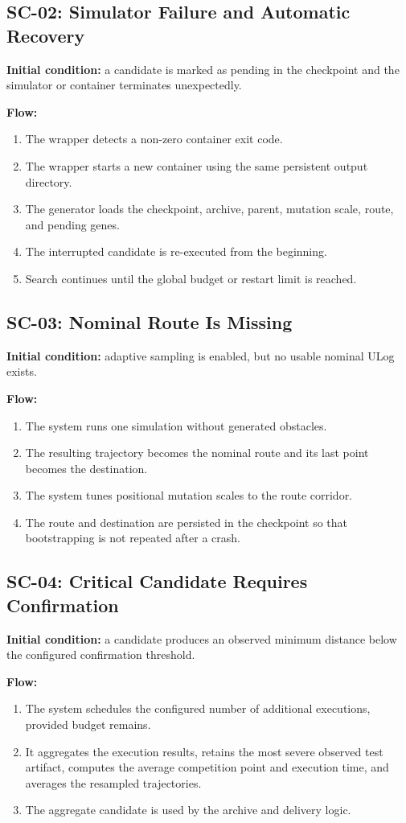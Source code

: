 \documentclass[11pt,a4paper]{report}
\begin{document}
\subsection{SC-02: Simulator Failure and Automatic Recovery}
\textbf{Initial condition:} a candidate is marked as pending in the checkpoint and the simulator or container terminates unexpectedly.

\textbf{Flow:}
\begin{enumerate}
  \item The wrapper detects a non-zero container exit code.
  \item The wrapper starts a new container using the same persistent output directory.
  \item The generator loads the checkpoint, archive, parent, mutation scale, route, and pending genes.
  \item The interrupted candidate is re-executed from the beginning.
  \item Search continues until the global budget or restart limit is reached.
\end{enumerate}

\subsection{SC-03: Nominal Route Is Missing}
\textbf{Initial condition:} adaptive sampling is enabled, but no usable nominal ULog exists.

\textbf{Flow:}
\begin{enumerate}
  \item The system runs one simulation without generated obstacles.
  \item The resulting trajectory becomes the nominal route and its last point becomes the destination.
  \item The system tunes positional mutation scales to the route corridor.
  \item The route and destination are persisted in the checkpoint so that bootstrapping is not repeated after a crash.
\end{enumerate}

\subsection{SC-04: Critical Candidate Requires Confirmation}
\textbf{Initial condition:} a candidate produces an observed minimum distance below the configured confirmation threshold.

\textbf{Flow:}
\begin{enumerate}
  \item The system schedules the configured number of additional executions, provided budget remains.
  \item It aggregates the execution results, retains the most severe observed test artifact, computes the average competition point and execution time, and averages the resampled trajectories.
  \item The aggregate candidate is used by the archive and delivery logic.
\end{enumerate}
\end{document}

